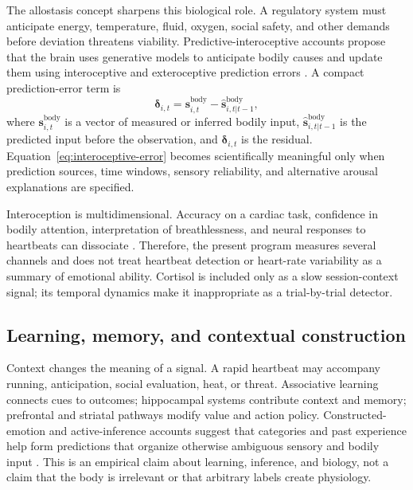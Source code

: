 \documentclass[conference]{IEEEtran}
\begin{document}
The allostasis concept sharpens this biological role. A regulatory system must anticipate energy, temperature, fluid, oxygen, social safety, and other demands before deviation threatens viability. Predictive-interoceptive accounts propose that the brain uses generative models to anticipate bodily causes and update them using interoceptive and exteroceptive prediction errors \cite{Barrett2017,Kleckner2017}. A compact prediction-error term is
\begin{equation}
\boldsymbol{\delta}_{i,t}=\mathbf{s}^{\mathrm{body}}_{i,t}-\widehat{\mathbf{s}}^{\mathrm{body}}_{i,t|t-1},
\label{eq:interoceptive-error}
\end{equation}
where $\mathbf{s}^{\mathrm{body}}_{i,t}$ is a vector of measured or inferred bodily input, $\widehat{\mathbf{s}}^{\mathrm{body}}_{i,t|t-1}$ is the predicted input before the observation, and $\boldsymbol{\delta}_{i,t}$ is the residual. Equation~\eqref{eq:interoceptive-error} becomes scientifically meaningful only when prediction sources, time windows, sensory reliability, and alternative arousal explanations are specified.

Interoception is multidimensional. Accuracy on a cardiac task, confidence in bodily attention, interpretation of breathlessness, and neural responses to heartbeats can dissociate \cite{Suksasilp2022}. Therefore, the present program measures several channels and does not treat heartbeat detection or heart-rate variability as a summary of emotional ability. Cortisol is included only as a slow session-context signal; its temporal dynamics make it inappropriate as a trial-by-trial detector.

\subsection{Learning, memory, and contextual construction}

Context changes the meaning of a signal. A rapid heartbeat may accompany running, anticipation, social evaluation, heat, or threat. Associative learning connects cues to outcomes; hippocampal systems contribute context and memory; prefrontal and striatal pathways modify value and action policy. Constructed-emotion and active-inference accounts suggest that categories and past experience help form predictions that organize otherwise ambiguous sensory and bodily input \cite{Barrett2017}. This is an empirical claim about learning, inference, and biology, not a claim that the body is irrelevant or that arbitrary labels create physiology.
\end{document}
